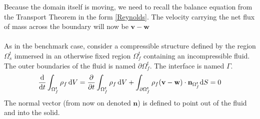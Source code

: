 Because the domain itself is moving, we need to recall the balance equation from the Transport Theorem in the form \eqref{Reynolds}. The velocity carrying the net flux of mass across the boundary will now be $\mathbf{v}-\mathbf{w}$
\\
\\
As in the benchmark case, consider a compressible structure defined by the region $\Omega_s^t$ immersed in an otherwise fixed region $\Omega_f^t$ containing an incompressible fluid. The outer boundaries of the fluid is named $\partial \Omega_f^t$. The interface is named $\Gamma$. \\
\begin{align}
\frac{\mathrm{d}}{\mathrm{d}t}\int_{\Omega_f^t} \rho_f \, \mathrm{d}V = \frac{\partial }{\partial t}\int_{\Omega_f^t} \rho_f \, \mathrm{d}V + \int_{\partial \Omega_f^t} \rho_f(\mathbf{v}-\mathbf{w})\cdot \mathbf{n}_{\Omega_f^t} \mathrm{d}S = 0
\end{align}
The normal vector (from now on denoted $\mathbf{n}$) is defined to point out of the fluid and into the solid. 





